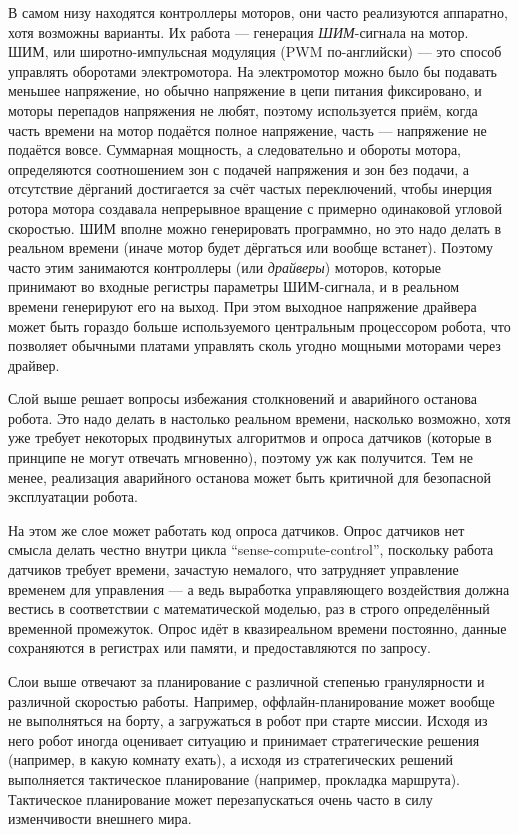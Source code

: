 \documentclass{../../text-style}
\begin{document}
В самом низу находятся контроллеры моторов, они часто реализуются аппаратно, хотя возможны варианты.
Их работа --- генерация \emph{ШИМ}-сигнала на мотор.
ШИМ, или широтно-импульсная модуляция (PWM по-английски) --- это способ управлять оборотами электромотора. 
На электромотор можно было бы подавать меньшее напряжение, но обычно напряжение в цепи питания фиксировано, и моторы перепадов напряжения не любят, поэтому используется приём, когда часть времени на мотор подаётся полное напряжение, часть --- напряжение не подаётся вовсе.
Суммарная мощность, а следовательно и обороты мотора, определяются соотношением зон с подачей напряжения и зон без подачи, а отсутствие дёрганий достигается за счёт частых переключений, чтобы инерция ротора мотора создавала непрерывное вращение с примерно одинаковой угловой скоростью.
ШИМ вполне можно генерировать программно, но это надо делать в реальном времени (иначе мотор будет дёргаться или вообще встанет).
Поэтому часто этим занимаются контроллеры (или \emph{драйверы}) моторов, которые принимают во входные регистры параметры ШИМ-сигнала, и в реальном времени генерируют его на выход.
При этом выходное напряжение драйвера может быть гораздо больше используемого центральным процессором робота, что позволяет обычными платами управлять сколь угодно мощными моторами через драйвер.

Слой выше решает вопросы избежания столкновений и аварийного останова робота.
Это надо делать в настолько реальном времени, насколько возможно, хотя уже требует некоторых продвинутых алгоритмов и опроса датчиков (которые в принципе не могут отвечать мгновенно), поэтому уж как получится.
Тем не менее, реализация аварийного останова может быть критичной для безопасной эксплуатации робота.

На этом же слое может работать код опроса датчиков.
Опрос датчиков нет смысла делать честно внутри цикла \enquote{sense-compute-control}, поскольку работа датчиков требует времени, зачастую немалого, что затрудняет управление временем для управления --- а ведь выработка управляющего воздействия должна вестись в соответствии с математической моделью, раз в строго определённый временной промежуток.
Опрос идёт в квазиреальном времени постоянно, данные сохраняются в регистрах или памяти, и предоставляются по запросу.

Слои выше отвечают за планирование с различной степенью гранулярности и различной скоростью работы.
Например, оффлайн-планирование может вообще не выполняться на борту, а загружаться в робот при старте миссии.
Исходя из него робот иногда оценивает ситуацию и принимает стратегические решения (например, в какую комнату ехать), а исходя из стратегических решений выполняется тактическое планирование (например, прокладка маршрута).
Тактическое планирование может перезапускаться очень часто в силу изменчивости внешнего мира.
\end{document}
